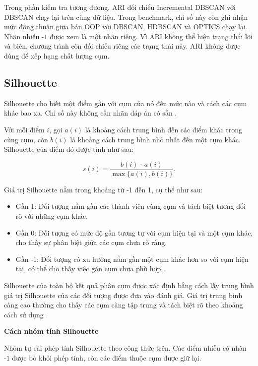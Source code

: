 Trong phần kiểm tra tương đương, ARI đối chiếu Incremental DBSCAN với DBSCAN chạy lại trên cùng dữ liệu. Trong benchmark, chỉ số này còn ghi nhận mức đồng thuận giữa bản OOP với DBSCAN, HDBSCAN và OPTICS chạy lại. Nhãn nhiễu \(\text{-}1\) được xem là một nhãn riêng. Vì ARI không thể hiện trạng thái lõi và biên, chương trình còn đối chiếu riêng các trạng thái này. ARI không được dùng để xếp hạng chất lượng cụm.

\subsection{Silhouette}

Silhouette cho biết một điểm gần với cụm của nó đến mức nào và cách các cụm khác bao xa. Chỉ số này không cần nhãn đáp án có sẵn \parencite{rousseeuw1987silhouette}.

Với mỗi điểm \(i\), gọi \(a(i)\) là khoảng cách trung bình đến các điểm khác trong cùng cụm, còn \(b(i)\) là khoảng cách trung bình nhỏ nhất đến một cụm khác. Silhouette của điểm đó được tính như sau:

\begin{equation}
    s(i)=\frac{b(i)\;\text{-}\;a(i)}{\max\{a(i),b(i)\}}.
\end{equation}

Giá trị Silhouette nằm trong khoảng từ -1 đến 1, cụ thể như sau:

\begin{itemize}
    \item Gần 1: Đối tượng nằm gần các thành viên cùng cụm và tách biệt tương đối rõ với những cụm khác.
    \item Gần 0: Đối tượng có mức độ gần tương tự với cụm hiện tại và một cụm khác, cho thấy sự phân biệt giữa các cụm chưa rõ ràng.
    \item Gần -1: Đối tượng có xu hướng nằm gần một cụm khác hơn so với cụm hiện tại, có thể cho thấy việc gán cụm chưa phù hợp \parencite{rousseeuw1987silhouette}.
\end{itemize}

Silhouette của toàn bộ kết quả phân cụm được xác định bằng cách lấy trung bình giá trị Silhouette của các đối tượng được đưa vào đánh giá. Giá trị trung bình càng cao thường cho thấy các cụm càng tập trung và tách biệt rõ theo khoảng cách sử dụng \parencite{rousseeuw1987silhouette}.

\textbf{Cách nhóm tính Silhouette}

Nhóm tự cài phép tính Silhouette theo công thức trên. Các điểm nhiễu có nhãn \(\text{-}1\) được bỏ khỏi phép tính, còn các điểm thuộc cụm được giữ lại.

